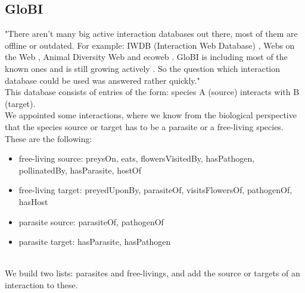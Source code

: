     \subsection{GloBI}
       "There aren't many big active interaction databases out there, most of them are 
        offline or outdated. For example: IWDB (Interaction Web Database) \cite{IWDB2003}, Webs on the 
        Web \cite{WOW2004}, Animal Diversity Web \cite{Myers2003} and ecoweb \cite{Cohen2010}. GloBI is 
        including most of the known ones and is still growing actively \cite{Poelen2014}. So the 
        question which interaction database could be used was answered rather quickly." \\

      This database consists of entries of the form: species A (source) interacts with B (target). \\
      We appointed some interactions, where we know from the biological perspective that the species 
      source or target has to be a parasite or a free-living species. These are the following:
      \begin{itemize}
        \item free-living source: preysOn, eats, flowersVisitedBy, hasPathogen, pollinatedBy, 
          hasParasite, hostOf
        \item free-living target: preyedUponBy, parasiteOf, visitsFlowersOf, pathogenOf, hasHost
        \item parasite source: parasiteOf, pathogenOf
        \item parasite target: hasParasite, hasPathogen
      \end{itemize}
       \\
      We build two lists: parasites and free-livings, and add the source or targets of an interaction
        to these. \\
       \\
       \\ \\
      
